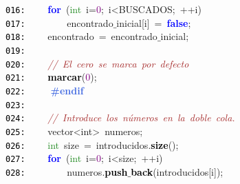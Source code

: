 \documentclass[a4paper,10pt]{scrartcl}
\begin{document}
{   \mbox{}\texttt{\textcolor{Black}{016:}} \ \ \ \ \textbf{\textcolor{Blue}{for}}\ \textcolor{BrickRed}{(}\textcolor{ForestGreen}{int}\ i\textcolor{BrickRed}{=}\textcolor{Purple}{0}\textcolor{BrickRed}{;}\ i\textcolor{BrickRed}{\textless{}}BUSCADOS\textcolor{BrickRed}{;}\ \textcolor{BrickRed}{++}i\textcolor{BrickRed}{)} \\
   \mbox{}\texttt{\textcolor{Black}{017:}} \ \ \ \ \ \ \ \ encontrado$\_$inicial\textcolor{BrickRed}{[}i\textcolor{BrickRed}{]}\ \textcolor{BrickRed}{=}\ \textbf{\textcolor{Blue}{false}}\textcolor{BrickRed}{;} \\
   \mbox{}\texttt{\textcolor{Black}{018:}} \ \ \ \ encontrado\ \textcolor{BrickRed}{=}\ encontrado$\_$inicial\textcolor{BrickRed}{;} \\
   \mbox{}\texttt{\textcolor{Black}{019:}} \ \  \\
   \mbox{}\texttt{\textcolor{Black}{020:}} \ \ \ \ \textit{\textcolor{Brown}{//\ El\ cero\ se\ marca\ por\ defecto}} \\
   \mbox{}\texttt{\textcolor{Black}{021:}} \ \ \ \ \textbf{\textcolor{Black}{marcar}}\textcolor{BrickRed}{(}\textcolor{Purple}{0}\textcolor{BrickRed}{);} \\
   \mbox{}\texttt{\textcolor{Black}{022:}} \textbf{\textcolor{RoyalBlue}{\ \ \ \ \#endif}} \\
   \mbox{}\texttt{\textcolor{Black}{023:}} \ \  \\
   \mbox{}\texttt{\textcolor{Black}{024:}} \ \ \ \ \textit{\textcolor{Brown}{//\ Introduce\ los\ números\ en\ la\ doble\ cola.}} \\
   \mbox{}\texttt{\textcolor{Black}{025:}} \ \ \ \ \textcolor{TealBlue}{vector\textless{}int\textgreater{}}\ numeros\textcolor{BrickRed}{;} \\
   \mbox{}\texttt{\textcolor{Black}{026:}} \ \ \ \ \textcolor{ForestGreen}{int}\ size\ \textcolor{BrickRed}{=}\ introducidos\textcolor{BrickRed}{.}\textbf{\textcolor{Black}{size}}\textcolor{BrickRed}{();} \\
   \mbox{}\texttt{\textcolor{Black}{027:}} \ \ \ \ \textbf{\textcolor{Blue}{for}}\ \textcolor{BrickRed}{(}\textcolor{ForestGreen}{int}\ i\textcolor{BrickRed}{=}\textcolor{Purple}{0}\textcolor{BrickRed}{;}\ i\textcolor{BrickRed}{\textless{}}size\textcolor{BrickRed}{;}\ \textcolor{BrickRed}{++}i\textcolor{BrickRed}{)} \\
   \mbox{}\texttt{\textcolor{Black}{028:}} \ \ \ \ \ \ \ \ numeros\textcolor{BrickRed}{.}\textbf{\textcolor{Black}{push$\_$back}}\textcolor{BrickRed}{(}introducidos\textcolor{BrickRed}{[}i\textcolor{BrickRed}{]);} \\
}
\end{document}
